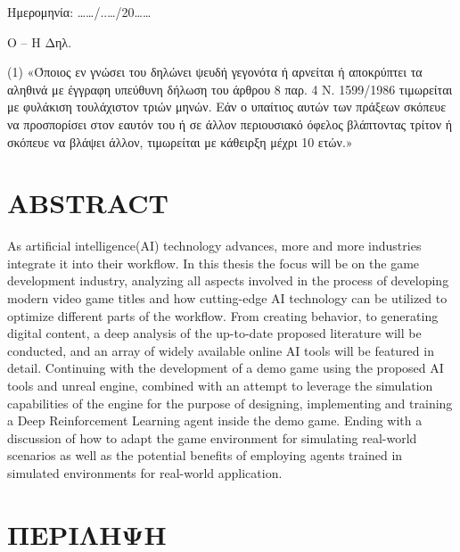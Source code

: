 \documentclass[a4paper,one side,12pt]{book}
\newcommand\blankpage{%
    \null
    \thispagestyle{empty}%
    \addtocounter{page}{-1}%
    \newpage}
\begin{document}
\begin{flushright} 

Ημερομηνία:      ……/..…/20……

Ο – Η Δηλ.

\end{flushright}
\vspace{7em}

(1)   «Όποιος εν γνώσει του δηλώνει ψευδή γεγονότα ή αρνείται ή αποκρύπτει τα αληθινά με έγγραφη υπεύθυνη δήλωση 
του άρθρου 8 παρ. 4 Ν. 1599/1986 τιμωρείται με φυλάκιση τουλάχιστον τριών μηνών. Εάν ο υπαίτιος αυτών των πράξεων 
σκόπευε να προσπορίσει στον εαυτόν του ή σε άλλον περιουσιακό όφελος βλάπτοντας τρίτον ή σκόπευε να βλάψει άλλον, τιμωρείται με κάθειρξη μέχρι 10 ετών.»

\blankpage
\blankpage

\chapter{ABSTRACT}

As artificial intelligence(AI) technology advances, more and more industries integrate it into their workflow. In this thesis the focus will be on the game development industry, analyzing all aspects involved
in the process of developing modern video game titles and how cutting-edge AI technology can be utilized to optimize different parts of the workflow. From creating behavior, to generating digital
content, a deep analysis of the up-to-date proposed literature will be
conducted, and an array of widely available online AI tools will be
featured in detail. Continuing with the development of a demo game using the
proposed AI tools and unreal engine, combined with an attempt to leverage the simulation capabilities of the engine for the purpose of designing, implementing and training a Deep Reinforcement Learning agent inside the demo game. Ending with a discussion of how to adapt the game environment for simulating real-world scenarios as well as the potential benefits of employing agents trained in simulated environments for real-world application.

\chapter{ΠΕΡΙΛΗΨΗ}
\end{document}
